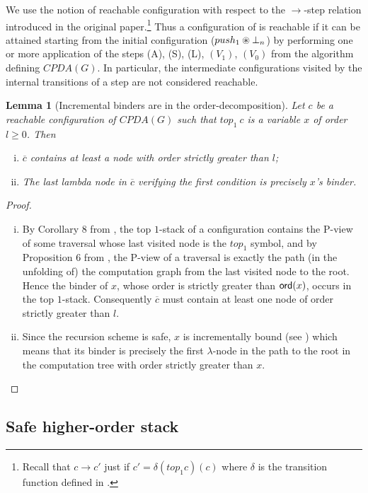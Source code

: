 \documentclass{article}
\newtheorem{lemma}{Lemma}[section]
\theoremstyle{remark}
\theoremstyle{definition}
\newcommand\orddec\overline
\begin{document}
We use the notion of reachable configuration
with respect to the $\rightarrow$-step relation introduced in the original paper.\footnote{Recall that $c\rightarrow c'$
just if $c' = \delta(top_1 c)(c)$ where $\delta$ is the transition
function defined in \cite[Figure 2]{hague-sto07}.} Thus a configuration of is reachable if it can be attained starting from the initial configuration ($push_1 \circledast \bot_n$) by performing one or more application of the steps (A), (S), (L), $(V_1)$, $(V_0)$ from the algorithm defining $CPDA(G)$.
In particular, the intermediate configurations visited by the internal transitions of a step are not considered reachable.

\begin{lemma}[Incremental binders are in the order-decomposition]
\label{lem:binder_in_ordecompos} Let $c$ be a reachable
configuration of $CPDA(G)$ such that $top_1\
c$ is a variable $x$ of order $l\geq 0$. Then
\begin{enumerate}[i.]
\item $\orddec{c}$ contains at least a node with order strictly
greater than $l$;
\item The last lambda node in $\orddec{c}$ verifying the first condition is precisely $x$'s binder.
\end{enumerate}
\end{lemma}
\begin{proof}
\begin{enumerate}[i.]
\item By Corollary 8 from \cite{hague-sto07}, the top $1$-stack of a configuration contains the P-view of some
    traversal whose last visited node is the $top_1$ symbol, and
    by Proposition 6 from \cite{OngLics2006}, the P-view of a
    traversal is exactly the path (in the unfolding of) the
    computation graph from the last visited node to
    the root. Hence the binder of $x$, whose order
    is strictly greater than ${\sf ord}(x)$, occurs in the top $1$-stack.
    Consequently $\orddec{c}$ must contain at least one node of order strictly greater than $l$.

\item Since the recursion scheme is safe, $x$ is
 incrementally bound (see \cite{blumong:safelambdacalculus})
 which means that its binder is precisely the first $\lambda$-node in the
 path to the root in the computation tree with order strictly
 greater than $x$.
\end{enumerate}
\end{proof}

\subsection{Safe higher-order stack}
\end{document}
